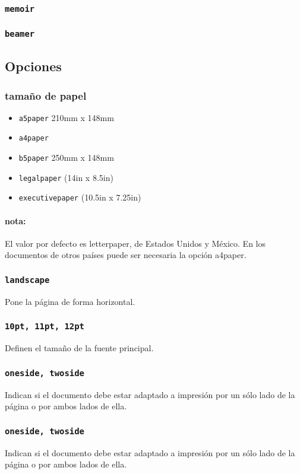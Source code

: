 \subsubsection{\texttt{memoir}}

\subsubsection{\texttt{beamer}}

\subsection*{Opciones}

\subsubsection{tamaño de papel}

\begin{itemize}
    \item \texttt{a5paper} 210mm x 148mm
    \item \texttt{a4paper} 
    \item \texttt{b5paper} 250mm x 148mm
    \item \texttt{legalpaper} (14in x 8.5in)
    \item \texttt{executivepaper} (10.5in x 7.25in)
\end{itemize}
\paragraph{nota:} El valor por defecto es letterpaper, de Estados Unidos y México. En los documentos de otros países puede ser necesaria la opción a4paper.

\subsubsection{\texttt{landscape}} Pone la página de forma horizontal.
\subsubsection{\texttt{10pt, 11pt, 12pt}} Definen el tamaño de la fuente principal.
\subsubsection{\texttt{oneside, twoside}} Indican si el documento debe estar adaptado a impresión por un sólo lado de la página o por ambos lados de ella.
\subsubsection{\texttt{oneside, twoside}} Indican si el documento debe estar adaptado a impresión por un sólo lado de la página o por ambos lados de ella.
